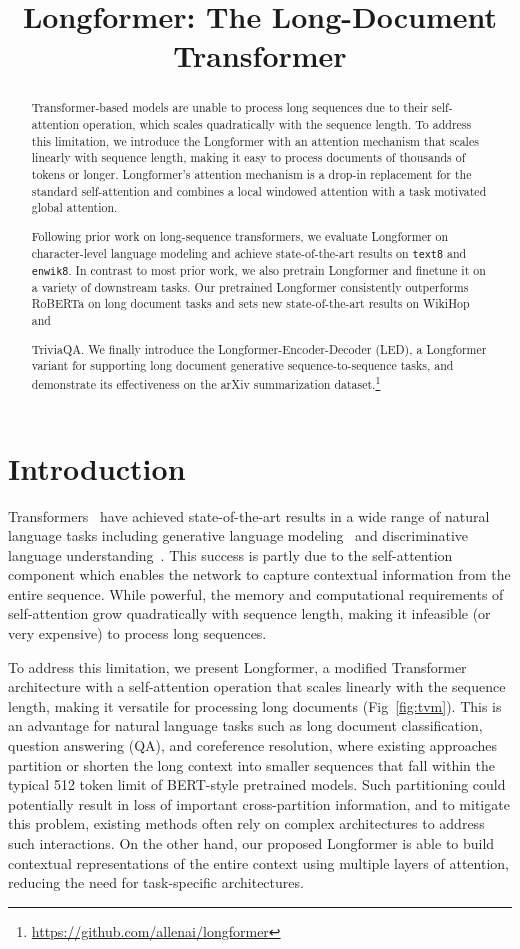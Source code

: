 \title{Longformer: The Long-Document Transformer}

\begin{abstract}
Transformer-based models are unable to process long sequences due to their self-attention operation, which scales quadratically with the sequence length. To address this limitation, we introduce the Longformer with an attention mechanism that scales linearly with sequence length, making it easy to process documents of thousands of tokens or longer. Longformer's attention mechanism is a drop-in replacement for the standard self-attention and combines a local windowed attention with a task motivated global attention.

Following prior work on long-sequence transformers, we evaluate Longformer on character-level language modeling and achieve state-of-the-art results on \texttt{text8} and \texttt{enwik8}.
In contrast to most prior work, we also pretrain Longformer and finetune it on a variety of downstream tasks. Our pretrained Longformer consistently outperforms RoBERTa on long document tasks and sets new state-of-the-art results on WikiHop and

TriviaQA. We finally introduce the Longformer-Encoder-Decoder (LED), a Longformer variant for supporting long document generative sequence-to-sequence tasks, and demonstrate its effectiveness on the arXiv summarization dataset.\footnote{\url{https://github.com/allenai/longformer}}
\end{abstract}

\section{Introduction}

Transformers~\cite{Vaswani2017AttentionIA} have achieved state-of-the-art results in a wide range of natural language tasks including generative language modeling~\cite{transformerxl,gpt2} and discriminative language understanding~\cite{bert}. This success is partly due to the self-attention component which enables the network to capture contextual information from the entire sequence. While powerful, the memory and computational requirements of self-attention grow quadratically with sequence length, making it infeasible (or very expensive) to process long sequences.

To address this limitation, we present Longformer, a modified Transformer architecture with a self-attention operation that scales linearly with the sequence length, making it versatile for processing long documents (Fig~\ref{fig:tvm}).
This is an advantage for natural language tasks such as long document classification, question answering (QA), and coreference resolution, where existing approaches partition or shorten the long context into smaller sequences that fall within the typical 512 token limit of BERT-style pretrained models. Such partitioning could potentially result in loss of important cross-partition information, and to mitigate this problem, existing methods often rely on complex architectures to address such interactions. On the other hand, our proposed Longformer is able to build contextual representations of the entire context using multiple layers of attention, reducing the need for task-specific architectures. 

